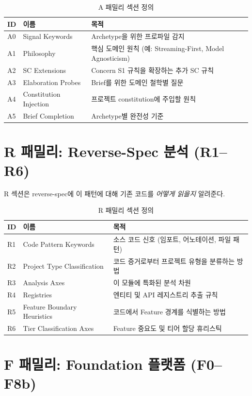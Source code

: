 \documentclass[11pt,a4paper,openright,twoside]{report}
\begin{document}
\begin{table}[H]
\centering
\caption{A 패밀리 섹션 정의}
\label{tab:a-sections}
\begin{tabularx}{\textwidth}{llX}
\toprule
\textbf{ID} & \textbf{이름} & \textbf{목적} \\
\midrule
A0 & Signal Keywords & Archetype을 위한 프로파일 감지 \\
A1 & Philosophy & 핵심 도메인 원칙 (예: Streaming-First, Model Agnosticism) \\
A2 & SC Extensions & Concern S1 규칙을 확장하는 추가 SC 규칙 \\
A3 & Elaboration Probes & Brief를 위한 도메인 철학별 질문 \\
A4 & Constitution Injection & 프로젝트 constitution에 주입할 원칙 \\
A5 & Brief Completion & Archetype별 완전성 기준 \\
\bottomrule
\end{tabularx}
\end{table}

\section{R 패밀리: Reverse-Spec 분석 (R1--R6)}

R 섹션은 reverse-spec에 이 패턴에 대해 기존 코드를 \emph{어떻게 읽을지} 알려준다.

\begin{table}[H]
\centering
\caption{R 패밀리 섹션 정의}
\label{tab:r-sections}
\begin{tabularx}{\textwidth}{llX}
\toprule
\textbf{ID} & \textbf{이름} & \textbf{목적} \\
\midrule
R1 & Code Pattern Keywords & 소스 코드 신호 (임포트, 어노테이션, 파일 패턴) \\
R2 & Project Type Classification & 코드 증거로부터 프로젝트 유형을 분류하는 방법 \\
R3 & Analysis Axes & 이 모듈에 특화된 분석 차원 \\
R4 & Registries & 엔티티 및 API 레지스트리 추출 규칙 \\
R5 & Feature Boundary Heuristics & 코드에서 Feature 경계를 식별하는 방법 \\
R6 & Tier Classification Axes & Feature 중요도 및 티어 할당 휴리스틱 \\
\bottomrule
\end{tabularx}
\end{table}

\section{F 패밀리: Foundation 플랫폼 (F0--F8b)}
\end{document}
